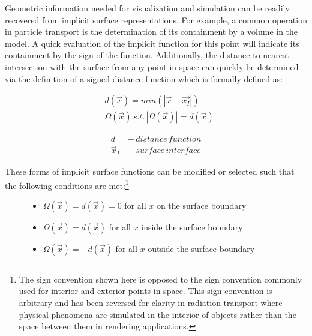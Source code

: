 Geometric information needed for visualization and simulation can be
readily recovered from implicit surface representations. For example, a common
operation in particle transport is the determination of its containment by a
volume in the model. A quick evaluation of the implicit function for this point
will indicate its containment by the sign of the function.
Additionally, the distance to nearest intersection with the surface from any
point in space can quickly be determined via the definition of a signed distance
function which is formally defined as:

\begin{align} \label{eq:sdf}
  & d(\vec{x}) = min(|\vec{x} - \vec{x_{I}}|) \\
  & \Omega(\vec{x})  \,s.t.  \, |\Omega(\vec{x})| = d(\vec{x})
\end{align}

\begin{align}
  d \, &- \, distance \, function \\
  \vec{x}_{I} \, &- \,surface \, interface
\end{align}

\noindent

\setcounter{footnote}{1}
These forms of implicit surface functions can be modified or selected such that the following
conditions are met:\footnote{The sign convention shown here is opposed to the
  sign convention commonly used for interior and exterior points in space. This
  sign convention is arbitrary and has been reversed for clarity in radiation
  transport where physical phenomena are simulated in the interior of objects
  rather than the space between them in rendering applications.}

\begin{figure}[H]
  \begin{center}
      \begin{itemize}
      \item $ \Omega(\vec{x}) = d(\vec{x}) = 0 $ for all $x$ on the surface boundary
      \item $ \Omega(\vec{x}) = d(\vec{x}) $ for all $x$ inside the surface boundary
      \item $ \Omega(\vec{x}) = -d(\vec{x}) $ for all $x$ outside the surface boundary
      \end{itemize}
  \end{center}
\end{figure}


